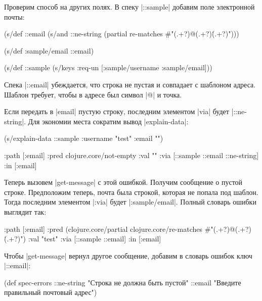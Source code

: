 Проверим способ на других полях. В спеку \spverb|::sample| добавим поле
электронной почты:

\begin{english}
  \begin{clojure}
(s/def ::email
  (s/and
   ::ne-string
   (partial re-matches #"(.+?)@(.+?)\.(.+?)")))

(s/def :sample/email ::email)

(s/def ::sample
  (s/keys :req-un [:sample/username
                   :sample/email]))
  \end{clojure}
\end{english}

Спека \spverb|::email| убеждается, что строка не пустая и совпадает с шаблоном
адреса. Шаблон требует, чтобы в адресе был символ \spverb|@| и точка.

Если передать в \spverb|email| пустую строку, последним элементом \spverb|via|
будет \spverb|::ne-string|. Для экономии места сократим вывод
\spverb|explain-data|:

\begin{english}
  \begin{clojure}
(s/explain-data ::sample {:username "test" :email ""})

{:path [:email]
 :pred clojure.core/not-empty
 :val ""
 :via [::sample ::email ::ne-string]
 :in [:email]}
  \end{clojure}
\end{english}

Теперь вызовем \spverb|get-message| с этой ошибкой. Получим сообщение о пустой
строке. Предположим теперь, почта была строкой, которая не попала под
шаблон. Тогда последним элементом \spverb|:via| будет
\spverb|:sample/email|. Полный словарь ошибки выглядит так:

\begin{english}
  \begin{clojure}
{:path [:email]
 :pred
 (clojure.core/partial
  clojure.core/re-matches
  #"(.+?)@(.+?)\.(.+?)")
 :val "test"
 :via [::sample ::email]
 :in [:email]}
  \end{clojure}
\end{english}

Чтобы \spverb|get-message| вернул другое сообщение, добавим в словарь ошибок
ключ \spverb|::email|:

  \begin{clojure}
(def spec-errors
  {::ne-string "Строка не должна быть пустой"
   ::email "Введите правильный почтовый адрес"})
  \end{clojure}

